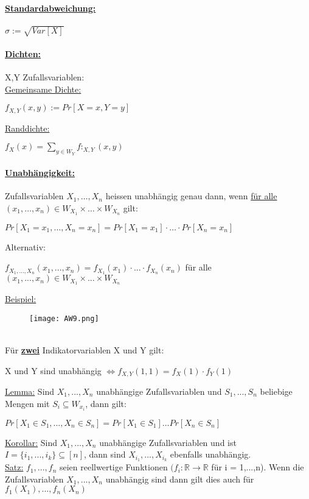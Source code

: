 \documentclass[8pt]{extreport}
\begin{document}
\paragraph{\underline{Standardabweichung:}}
\begin{center}
$\sigma := \sqrt{Var[X]}$
\end{center}
\paragraph{\underline{Dichten:}} X,Y Zufallsvariablen:\\
\underline{Gemeinsame Dichte:}
\begin{center}
$f_{X,Y}(x,y) := Pr[X=x, Y = y]$
\end{center}
\underline{Randdichte:}
\begin{center}
$f_X(x) = \displaystyle\sum_{y \in W_Y}f:_{X,Y}(x,y)$
\end{center}
\paragraph{\underline{Unabhängigkeit:}} Zufallsvariablen $X_1,\dots,X_n$ heissen unabhängig genau dann, wenn \underline{ für alle} $(x_1,\dots, x_n) \in W_{X_1} \times \dots \times W_{X_n}$ gilt:
\begin{center}
$Pr[X_1 = x_1, \dots, X_n = x_n] = Pr[X_1 = x_1] \cdot \dots \cdot Pr[X_n = x_n]$
\end{center}
Alternativ:
\begin{center}
$f_{X_1,...,X_n}(x_1,...,x_n) = f_{X_1}(x_1) \cdot ... \cdot f_{X_n}(x_n)$ für alle $(x_1,...,x_n) \in W_{X_1} \times ... \times W_{X_n}$
\end{center}
\underline{Beispiel:}
\begin{figure}[h!]
\centering\texttt{[image: AW9.png]}
\caption{}
\label{AW9}
\end{figure}\\
Für \textbf{\underline{zwei}} Indikatorvariablen X und Y gilt:
\begin{center}
X und Y sind unabhängig $\iff f_{X,Y}(1,1) = f_X(1) \cdot f_Y(1)$
\end{center}
\underline{Lemma:} Sind $X_1,...,X_n$ unabhängige Zufallsvariablen und $S_1,...,S_n$ beliebige Mengen mit $S_i \subseteq W_{x_i}$, dann gilt:
\begin{center}
$Pr[X_1 \in S_1,...,X_n \in S_n] = Pr[X_1 \in S_1] \dots Pr[X_n \in S_n]$
\end{center}
 \underline{Korollar:} Sind $X_1,...,X_n$ unabhängige Zufallsvariablen und ist $I =\{ i_1,...,i_k\} \subseteq [n]$, dann sind $X_{i_1},...,X_{i_k}$ ebenfalls unabhängig.\\
\underline{Satz:} $f_1,...,f_n$ seien reellwertige Funktionen $(f_i : \mathbb{R} \rightarrow \mathbb{R}$ für i = 1,...,n). Wenn die Zufallsvariablen $X_1,...,X_n$ unabhängig sind dann gilt dies auch für $f_1(X_1),...,f_n(X_n)$
\end{document}
